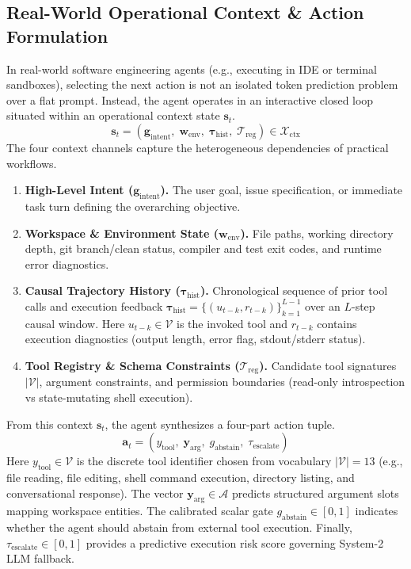 \documentclass[10pt,twocolumn,letterpaper]{article}
\begin{document}
\subsection{Real-World Operational Context \& Action Formulation}
In real-world software engineering agents (e.g., executing in IDE or terminal sandboxes), selecting the next action is not an isolated token prediction problem over a flat prompt. Instead, the agent operates in an interactive closed loop situated within an operational context state $\mathbf{s}_t$.
\begin{equation}
  \mathbf{s}_t = \left(\mathbf{g}_{\text{intent}}, \; \mathbf{w}_{\text{env}}, \; \mathbf{\tau}_{\text{hist}}, \; \mathcal{T}_{\text{reg}}\right) \in \mathcal{X}_{\text{ctx}}
\end{equation}
The four context channels capture the heterogeneous dependencies of practical workflows.
\begin{enumerate}[leftmargin=1.5em, itemsep=0.1em]
  \item \textbf{High-Level Intent ($\mathbf{g}_{\text{intent}}$).} The user goal, issue specification, or immediate task turn defining the overarching objective.
  \item \textbf{Workspace \& Environment State ($\mathbf{w}_{\text{env}}$).} File paths, working directory depth, git branch/clean status, compiler and test exit codes, and runtime error diagnostics.
  \item \textbf{Causal Trajectory History ($\mathbf{\tau}_{\text{hist}}$).} Chronological sequence of prior tool calls and execution feedback $\mathbf{\tau}_{\text{hist}} = \{(u_{t-k}, r_{t-k})\}_{k=1}^{L-1}$ over an $L$-step causal window. Here $u_{t-k} \in \mathcal{V}$ is the invoked tool and $r_{t-k}$ contains execution diagnostics (output length, error flag, stdout/stderr status).
  \item \textbf{Tool Registry \& Schema Constraints ($\mathcal{T}_{\text{reg}}$).} Candidate tool signatures $|\mathcal{V}|$, argument constraints, and permission boundaries (read-only introspection vs state-mutating shell execution).
\end{enumerate}

From this context $\mathbf{s}_t$, the agent synthesizes a four-part action tuple.
\begin{equation}
  \mathbf{a}_t = \left(y_{\text{tool}}, \; \mathbf{y}_{\text{arg}}, \; g_{\text{abstain}}, \; \tau_{\text{escalate}}\right)
\end{equation}
Here $y_{\text{tool}} \in \mathcal{V}$ is the discrete tool identifier chosen from vocabulary $|\mathcal{V}| = 13$ (e.g., file reading, file editing, shell command execution, directory listing, and conversational response). The vector $\mathbf{y}_{\text{arg}} \in \mathcal{A}$ predicts structured argument slots mapping workspace entities. The calibrated scalar gate $g_{\text{abstain}} \in [0, 1]$ indicates whether the agent should abstain from external tool execution. Finally, $\tau_{\text{escalate}} \in [0, 1]$ provides a predictive execution risk score governing System-2 LLM fallback.
\end{document}
